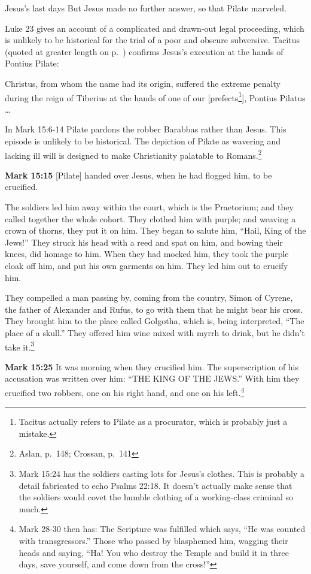 \documentclass[10pt,a5paper,twoside]{article}
\newcommand{\doimage}[2]{\texttt{[image: \#2]}\label{fig:#2}}
\newcommand{\figbasic}[4]{ %
    \ifthenelse{\isodd{\pageref{fig:#2}}}{}{\hfill}
    \ifstrempty{#3}{
      \doimage{#1}{#2}
    }{
      \makebox{\doimage{#1}{#2} \\ #3}
    }
    \ifthenelse{\isodd{\pageref{fig:#2}}}{\hfill}{}
    \par
}
\newcommand{\fig}[2][0.4]{
  \figbasic{#1}{#2}{}{}
}
\newcommand{\quotesize}{\normalsize{}}
\newcommand{\comm}[1]{\begingroup \color{black!50} #1\endgroup}
\newenvironment{quotetext}{\begingroup\quotesize}{\endgroup}
\newcommand{\intex}[1]{\index[texts]{#1}}
\newcommand{\reftex}[1]{#1\intex{#1}}
\newcommand{\bible}[2]{\begin{quotetext}\textbf{#1}\intex{#1} #2\end{quotetext}}
\newcommand{\gospelmark}[2]{\bible{Mark #1}{#2}}
\begin{document}
\begin{section}{Jesus's last days}
{  But Jesus made no further answer, so that Pilate marveled. 
}

\comm{\reftex{Luke 23} gives an account of a complicated and drawn-out legal proceeding, which is unlikely to be
historical for the trial of a poor and obscure subversive.
Tacitus (quoted at greater length on p.~\pageref{tacitus}) confirms
Jesus's execution at the hands of Pontius Pilate:}

\begin{quotetext}
Christus, from whom the name had its origin, suffered
the extreme penalty during the reign of Tiberius at the hands of one
of our [prefects\footnote{Tacitus actually refers to Pilate as a procurator, which is probably just a mistake.}], Pontius Pilatus \ldots
\end{quotetext}


\comm{In Mark 15:6-14 Pilate pardons the robber Barabbas rather than Jesus. This episode is unlikely to be historical.
The depiction of Pilate as wavering and lacking ill will is designed to make Christianity palatable to Romans.\footnote{Aslan, p.~148; Crossan,
p.~141}}

\fig{ecce-homo}

\gospelmark{15:15}{
[Pilate] handed over Jesus, when he had flogged him, to be crucified.

  The soldiers led him away within the court, which is the Praetorium; and they called together the whole cohort.   They clothed him with purple; and weaving a crown of thorns, they put it on him.   They began to salute him, ``Hail, King of the Jews!''   They struck his head with a reed and spat on him, and bowing their knees, did homage to him.   When they had mocked him, they took the purple cloak off him, and put his own garments on him. They led him out to crucify him.

  They compelled a man passing by, coming from the country, Simon of Cyrene, the father of Alexander and Rufus, to go with them that he might bear his cross.   They brought him to the place called Golgotha, which is, being interpreted, ``The place of a skull.''   They offered him wine mixed with myrrh to drink, but he didn't take it.\footnote{\reftex{Mark 15:24} has the soldiers casting lots for Jesus's clothes. This is probably a detail fabricated
to echo \reftex{Psalms 22:18}. It doesn't actually make sense that the soldiers would covet the humble clothing of a working-class criminal so much.}
}

\gospelmark{15:25}{
It was morning when they crucified him.   The superscription of his accusation was written over him: ``THE KING OF THE JEWS.''   With him they crucified two robbers, one on his right hand, and one on his left.\footnote{Mark 28-30 then has: The Scripture was fulfilled which says, 
``He was counted with transgressors.'' Those who passed by blasphemed him, wagging their heads and saying, ``Ha! You who destroy the Temple and build it in three days,   save yourself, and come down from the cross!''}
}


\end{section}
\end{document}
